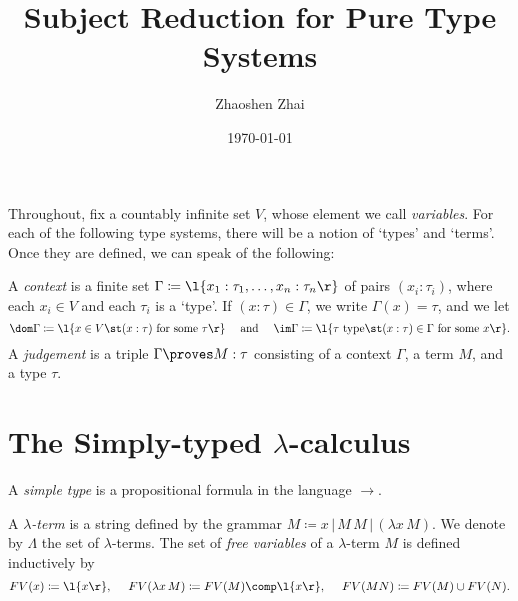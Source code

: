 \documentclass[reqno]{amsart}
\begin{document}
    \title{Subject Reduction for Pure Type Systems}
    \author{Zhaoshen Zhai}
    \date{\today}
    \maketitle

    Throughout, fix a countably infinite set $V$, whose element we call \textit{variables}. For each of the following type systems, there will be a notion of `types' and `terms'. Once they are defined, we can speak of the following:

    \begin{definition*}
        A \textit{context} is a finite set $\Gamma\coloneqq\l\{x_1:\tau_1,\dots,x_n:\tau_n\r\}$ of pairs $(x_i:\tau_i)$, where each $x_i\in V$ and each $\tau_i$ is a `type'. If $(x:\tau)\in\Gamma$, we write $\Gamma(x)=\tau$, and we let
        \begin{equation*}
            \dom\Gamma\coloneqq\l\{x\in V\st(x:\tau)\textrm{ for some }\tau\r\}\ \ \ \ \textrm{and}\ \ \ \ \im\Gamma\coloneqq\l\{\tau\textrm{ type}\st(x:\tau)\in\Gamma\textrm{ for some }x\r\}.
        \end{equation*}
        A \textit{judgement} is a triple $\Gamma\proves M:\tau$ consisting of a context $\Gamma$, a term $M$, and a type $\tau$.
    \end{definition*}

    \section{The Simply-typed $\lambda$-calculus}

    \begin{definition}
        A \textit{simple type} is a propositional formula in the language $\rightarrow$.
    \end{definition}

    \begin{definition}
        A \textit{$\lambda$-term} is a string defined by the grammar $M\coloneqq x\,|\,M\,M\,|\,(\lambda x\,M)$. We denote by $\Lambda$ the set of $\lambda$-terms. The set of \textit{free variables} of a $\lambda$-term $M$ is defined inductively by
        \begin{equation*}
            FV(x)\coloneqq\l\{x\r\},\ \ \ \ FV(\lambda x\,M)\coloneqq FV(M)\comp\l\{x\r\},\ \ \ \ FV(MN)\coloneqq FV(M)\cup FV(N).
        \end{equation*}
    \end{definition}
\end{document}
